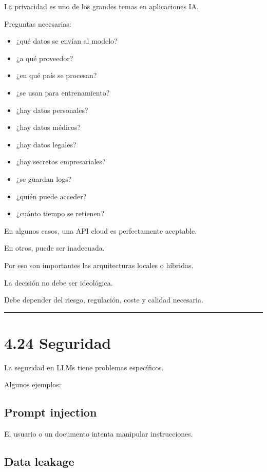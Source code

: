 La privacidad es uno de los grandes temas en aplicaciones IA.

Preguntas necesarias:

\begin{itemize}
\tightlist
\item
  ¿qué datos se envían al modelo?
\item
  ¿a qué proveedor?
\item
  ¿en qué país se procesan?
\item
  ¿se usan para entrenamiento?
\item
  ¿hay datos personales?
\item
  ¿hay datos médicos?
\item
  ¿hay datos legales?
\item
  ¿hay secretos empresariales?
\item
  ¿se guardan logs?
\item
  ¿quién puede acceder?
\item
  ¿cuánto tiempo se retienen?
\end{itemize}

En algunos casos, una API cloud es perfectamente aceptable.

En otros, puede ser inadecuada.

Por eso son importantes las arquitecturas locales o híbridas.

La decisión no debe ser ideológica.

Debe depender del riesgo, regulación, coste y calidad necesaria.

\begin{center}\rule{0.5\linewidth}{0.5pt}\end{center}

\section{4.24 Seguridad}\label{seguridad-1}

La seguridad en LLMs tiene problemas específicos.

Algunos ejemplos:

\subsection{Prompt injection}\label{prompt-injection}

El usuario o un documento intenta manipular instrucciones.

\subsection{Data leakage}\label{data-leakage}

